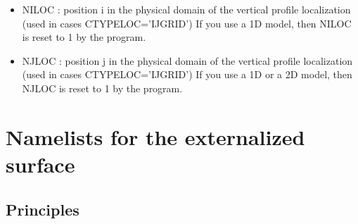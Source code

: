 \begin{itemize}
\item
 NILOC : position i  in the physical domain  of the vertical profile localization   (used in cases 
                                         CTYPELOC='IJGRID') 
If you use a 1D model, then NILOC is reset to 1 by the program.
 
                                         
\item
 NJLOC :  position    j  in the physical domain of the vertical profile localization   (used in cases 
                                         CTYPELOC='IJGRID') 
If you use a 1D or a 2D  model, then NJLOC is reset to 1 by the program.

\end{itemize}

\section{Namelists for the externalized surface}
\subsection{Principles}

